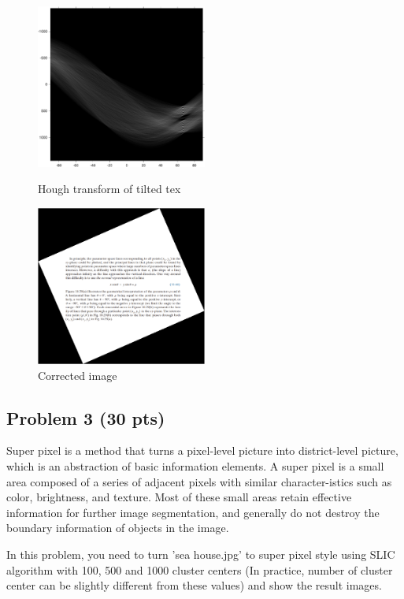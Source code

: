\documentclass[11pt,letterpaper]{article}
\begin{document}
\begin{figure}
	\centering
	\includegraphics[width=0.5\textwidth]{../images/p2/p2a}
	\caption{Hough transform  of tilted tex}
	\label{fig:p2a}
	\includegraphics[width=0.5\textwidth]{../images/p2/p2b}
	\caption{Corrected image}
	\label{fig:p2b}
\end{figure}
\clearpage

\subsection*{Problem 3 (30 pts)}

Super pixel is a method that turns a pixel-level picture into district-level picture, which is an abstraction of basic information elements. A super pixel is a small area composed of a series of adjacent pixels with similar character-istics such as color, brightness, and texture. Most of these small areas retain effective information for further image segmentation, and generally do not destroy the boundary information of objects in the image.

In this problem, you need to turn ’sea house.jpg’ to super pixel style using SLIC algorithm with 100, 500 and 1000 cluster centers (In practice, number of cluster center can be slightly different from these values) and show the result images.
\end{document}
